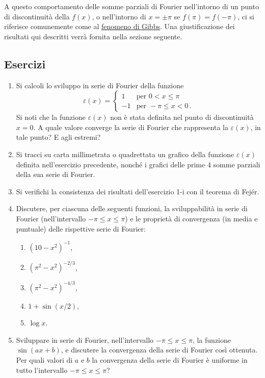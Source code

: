\documentclass[11pt, a4paper]{book}
\numberwithin{equation}{section}
\newenvironment{esercizi}{\subsection*{Esercizi}\begin{enumerate}}{\end{enumerate}}
\begin{document}
A questo comportamento delle somme parziali di Fourier nell'intorno di un punto di discontinuità della $f(x)$, o nell'intorno di $x=\pm\pi$ se $f(\pi)=f(-\pi)$, ci si riferisce comunemente come al \underline{fenomeno di Gibbs}. Una giustificazione dei risultati qui descritti verrà fornita nella sezione seguente.

\begin{esercizi}
\item Si calcoli lo sviluppo in serie di Fourier della funzione
\[
  \varepsilon(x) = \begin{cases} 1 & \text{per } 0 < x \leq \pi \\ -1 & \text{per } -\pi \leq x < 0\,. \end{cases}
\]
Si noti che la funzione $\varepsilon(x)$ non è stata definita nel punto di discontinuità $x=0$. A quale valore converge la serie di Fourier che rappresenta la $\varepsilon(x)$, in tale punto? E agli estremi?

\item Si tracci su carta millimetrata o quadrettata un grafico della funzione $\varepsilon(x)$ definita nell'esercizio precedente, nonché i grafici delle prime 4 somme parziali della sua serie di Fourier.

\item Si verifichi la consistenza dei risultati dell'esercizio 1-i con il teorema di Fejér.

\item Discutere, per ciascuna delle seguenti funzioni, la sviluppabilità in serie di Fourier (nell'intervallo $-\pi \leq x \leq \pi$) e le proprietà di convergenza (in media e puntuale) delle rispettive serie di Fourier:
\begin{enumerate}
  \item $(10-x^2)^{-1}$,
  \item $(\pi^2-x^2)^{-2/3}$,
  \item $(\pi^2-x^2)^{-4/3}$,
  \item $1+\sin(x/2)$,
  \item $\log x$.
\end{enumerate}

\item Sviluppare in serie di Fourier, nell'intervallo $-\pi \leq x \leq \pi$, la funzione $\sin(ax+b)$, e discutere la convergenza della serie di Fourier così ottenuta. Per quali valori di $a$ e $b$ la convergenza della serie di Fourier è uniforme in tutto l'intervallo $-\pi \leq x \leq \pi$?
\end{esercizi}
\end{document}
